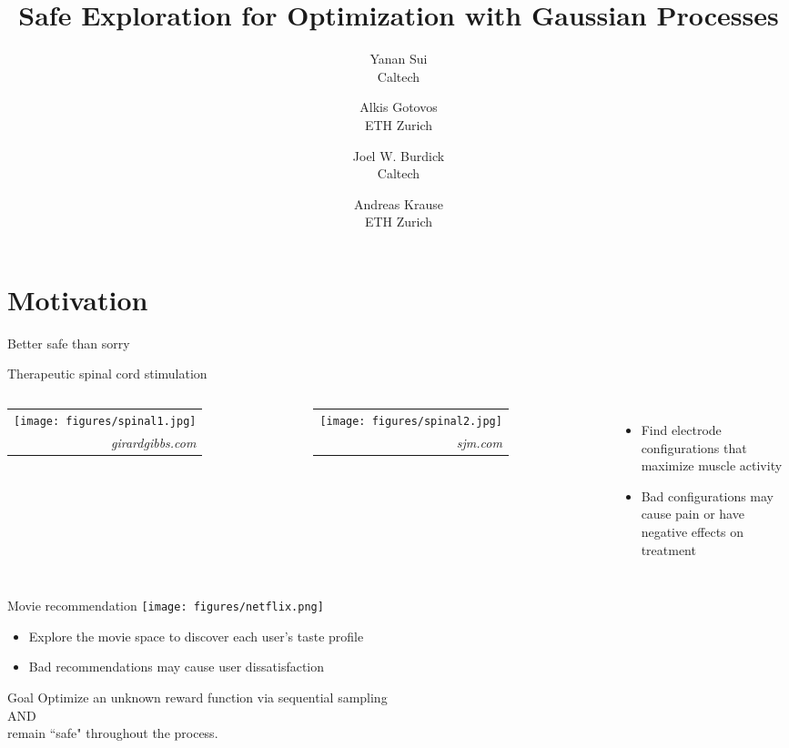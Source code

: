 \documentclass[10pt,mathserif]{beamer}
\title[Safe Gaussian Process Optimization]
{Safe Exploration for Optimization with Gaussian Processes}
\author[Alkis Gotovos]{
\vspace{1in}
\normalsize
\parbox{1in}{Yanan Sui\\{\footnotesize Caltech}}\and
\parbox{1in}{Alkis Gotovos\\{\footnotesize ETH Zurich}}\and
\parbox{1in}{Joel W. Burdick\\{\footnotesize Caltech}}\and
\parbox{1in}{Andreas Krause\\{\footnotesize ETH Zurich}}
}
\date[May 4, 2015]{
\begin{center}
{\normalsize
ICML '15
}
\end{center}
}
\newcommand{\sig}[2]{%
\begin{tabular}{r}
#1\\[-0.7em]
{\tiny \color{darkgray}\it #2\hspace{0.5em}}
\end{tabular}}
\begin{document}


\section{Motivation}

\begin{frame}{Better safe than sorry}
\end{frame}

\begin{frame}{Therapeutic spinal cord stimulation}
\begin{columns}[c]
\centering
\sig{\texttt{[image: figures/spinal1.jpg]}}{girardgibbs.com}

\centering
\sig{\texttt{[image: figures/spinal2.jpg]}}{sjm.com}
\begin{itemize}
\item Find electrode configurations that maximize muscle activity
\item Bad configurations may cause pain or have negative effects on treatment
\end{itemize}
\end{columns}
\end{frame}

\begin{frame}{Movie recommendation}
\centering
\texttt{[image: figures/netflix.png]}
\vspace{2em}
\begin{itemize}
\item Explore the movie space to discover each user's taste profile
\item Bad recommendations may cause user dissatisfaction
\end{itemize}
\end{frame}

\begin{frame}{Goal}
\centering
\large
Optimize an unknown reward function via sequential sampling\\[1em]
AND\\[1em]
remain ``safe" throughout the process.
\end{frame}
\end{document}
